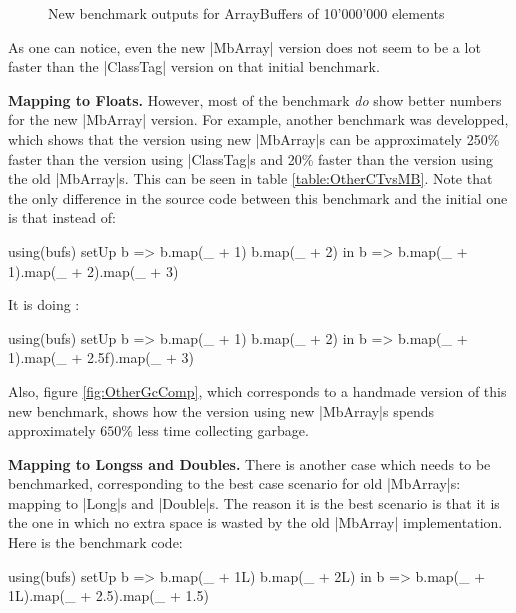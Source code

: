 

\begin{figure}
\caption{New benchmark outputs for ArrayBuffers of 10'000'000 elements}
\label{fig:NewGcComp}
\end{figure}

As one can notice, even the new |MbArray| version does not seem to be a lot faster than the |ClassTag| version on that initial benchmark. 

\textbf{Mapping to Floats.} However, most of the benchmark \emph{do} show better numbers for the new |MbArray| version. For example, another benchmark was developped, which shows that the version using new |MbArray|s can be approximately 250\% faster than the version using |ClassTag|s and 20\% faster than the version using the old |MbArray|s. This can be seen in table \ref{table:OtherCTvsMB}. Note that the only difference in the source code between this benchmark and the initial one is that instead of:

\begin{lstlisting-nobreak}
  using(bufs) setUp {
    b => 
      b.map(_ + 1)
      b.map(_ + 2)
  } in {
    b => b.map(_ + 1).map(_ + 2).map(_ + 3)
  }
\end{lstlisting-nobreak}

It is doing : 

\begin{lstlisting-nobreak}
  using(bufs) setUp {
    b => 
      b.map(_ + 1)
      b.map(_ + 2)
  } in {
    b => b.map(_ + 1).map(_ + 2.5f).map(_ + 3)
  }
\end{lstlisting-nobreak}

Also, figure \ref{fig:OtherGcComp}, which corresponds to a handmade version of this new benchmark, shows how the version using new |MbArray|s spends approximately $650\%$ less time collecting garbage.

\textbf{Mapping to Longss and Doubles.} There is another case which needs to be benchmarked, corresponding to the best case scenario for old |MbArray|s: mapping to |Long|s and |Double|s. The reason it is the best scenario is that it is the one in which no extra space is wasted by the old |MbArray| implementation. Here is the benchmark code:

\begin{lstlisting-nobreak}
  using(bufs) setUp {
    b => 
      b.map(_ + 1L)
      b.map(_ + 2L)
  } in {
    b => b.map(_ + 1L).map(_ + 2.5).map(_ + 1.5)
  }
\end{lstlisting-nobreak}

